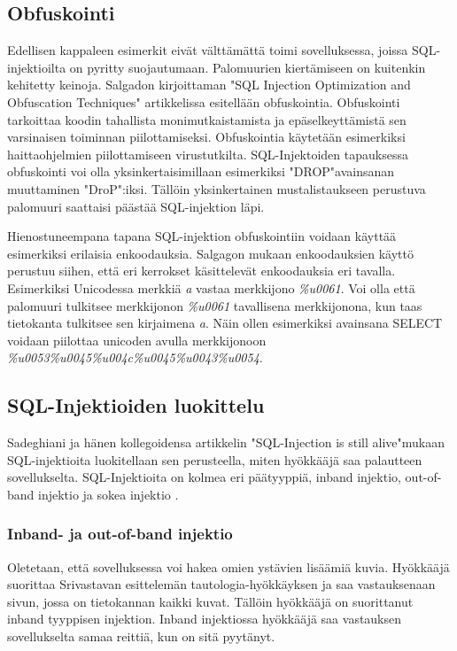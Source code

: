 \documentclass[finnish]{tktltiki2}
\theoremstyle{definition}
\theoremstyle{remark}
\begin{document}
	\subsection{Obfuskointi}
	
	Edellisen kappaleen esimerkit eivät välttämättä toimi sovelluksessa, joissa SQL-injektioilta on pyritty suojautumaan. Palomuurien kiertämiseen on kuitenkin kehitetty keinoja. Salgadon kirjoittaman "SQL Injection Optimization and Obfuscation Techniques"\space\cite{encoding} artikkelissa esitellään obfuskointia. Obfuskointi tarkoittaa koodin tahallista monimutkaistamista ja epäselkeyttämistä sen varsinaisen toiminnan piilottamiseksi. Obfuskointia käytetään esimerkiksi haittaohjelmien piilottamiseen virustutkilta. SQL-Injektoiden tapauksessa obfuskointi voi olla yksinkertaisimillaan esimerkiksi "DROP"\space avainsanan muuttaminen "DroP":iksi. Tällöin yksinkertainen mustalistaukseen perustuva palomuuri saattaisi päästää SQL-injektion läpi.
	
	Hienostuneempana tapana SQL-injektion obfuskointiin voidaan käyttää esimerkiksi erilaisia enkoodauksia. Salgagon mukaan enkoodauksien käyttö perustuu siihen, että eri kerrokset käsittelevät enkoodauksia eri tavalla. Esimerkiksi Unicodessa merkkiä \textit{a} vastaa merkkijono \textit{\%u0061}. Voi olla että palomuuri tulkitsee merkkijonon \textit{\%u0061} tavallisena merkkijonona, kun taas tietokanta tulkitsee sen kirjaimena \textit{a}. Näin ollen esimerkiksi avainsana SELECT voidaan piilottaa unicoden avulla merkkijonoon \textit{\%u0053\%u0045\%u004c\%u0045\%u0043\%u0054}.
	
	\subsection{SQL-Injektioiden luokittelu}
		Sadeghiani ja hänen kollegoidensa artikkelin "SQL-Injection is still alive"\space mukaan SQL-injektioita luokitellaan sen perusteella, miten
		 hyökkääjä saa palautteen sovellukselta. SQL-Injektioita on kolmea eri päätyyppiä, inband injektio, out-of-band injektio ja sokea injektio \cite{still-alive}.
	
	\subsubsection{Inband- ja out-of-band injektio}
	Oletetaan, että sovelluksessa voi hakea omien ystävien lisäämiä kuvia. Hyökkääjä suorittaa Srivastavan esittelemän tautologia-hyökkäyksen ja saa vastauksenaan sivun, jossa on tietokannan kaikki kuvat. Tällöin hyökkääjä on suorittanut inband tyyppisen injektion. Inband injektiossa hyökkääjä saa vastauksen sovellukselta samaa reittiä, kun on sitä pyytänyt.
	
\end{document}
